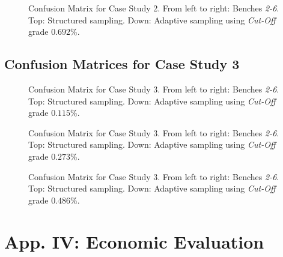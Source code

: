 	
	
\begin{figure}[h!]
	
	\centering
	\caption{\label{fig:CS2_0692_CC_PII} Confusion Matrix for Case Study 2. From left to right: Benches \emph{2-6}. Top: Structured sampling. Down: Adaptive sampling using \emph{Cut-Off} grade $0.692\%$.}
\end{figure}





\subsection*{Confusion Matrices for Case Study 3}

\begin{figure}[h!]
	\centering
	\caption{\label{fig:CS3_0115_CC_PII} Confusion Matrix for Case Study 3. From left to right: Benches \emph{2-6}. Top: Structured sampling. Down: Adaptive sampling using \emph{Cut-Off} grade $0.115\%$.}
\end{figure}

\clearpage
\begin{figure}[h!]
	\centering
	\caption{\label{fig:CS3_0273_CC_PII} Confusion Matrix for Case Study 3. From left to right: Benches \emph{2-6}. Top: Structured sampling. Down: Adaptive sampling using \emph{Cut-Off} grade $0.273\%$.}
	\centering

\hspace{5cm}
	\caption{\label{fig:CS3_0486_CC_PII} Confusion Matrix for Case Study 3. From left to right: Benches \emph{2-6}. Top: Structured sampling. Down: Adaptive sampling using \emph{Cut-Off} grade $0.486\%$.}
\end{figure}










\clearpage
\section{App. IV: Economic Evaluation}
\label{appendix_profit_PII}

